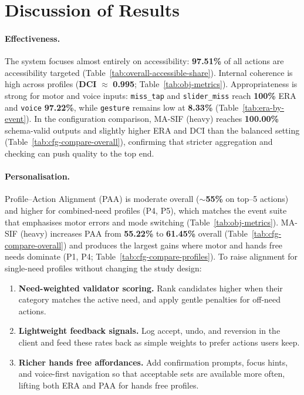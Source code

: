 \documentclass[openany]{book}
\begin{document}
\section{Discussion of Results}
\label{sec:discussion_eval}

\paragraph{Effectiveness.}
The system focuses almost entirely on accessibility: \textbf{97.51\%} of all actions are accessibility targeted (Table~\ref{tab:overall-accessible-share}). Internal coherence is high across profiles (\textbf{DCI} $\approx$ \textbf{0.995}; Table~\ref{tab:obj-metrics}). Appropriateness is strong for motor and voice inputs: \texttt{miss\_tap} and \texttt{slider\_miss} reach \textbf{100\%} ERA and \texttt{voice} \textbf{97.22\%}, while \texttt{gesture} remains low at \textbf{8.33\%} (Table~\ref{tab:era-by-event}). In the configuration comparison, MA-SIF (heavy) reaches \textbf{100.00\%} schema-valid outputs and slightly higher ERA and DCI than the balanced setting (Table~\ref{tab:cfg-compare-overall}), confirming that stricter aggregation and checking can push quality to the top end.

\paragraph{Personalisation.}
Profile–Action Alignment (PAA) is moderate overall (\(\sim\)\textbf{55\%} on top–5 actions) and higher for combined-need profiles (P4, P5), which matches the event suite that emphasises motor errors and mode switching (Table~\ref{tab:obj-metrics}). MA-SIF (heavy) increases PAA from \textbf{55.22\%} to \textbf{61.45\%} overall (Table~\ref{tab:cfg-compare-overall}) and produces the largest gains where motor and hands free needs dominate (P1, P4; Table~\ref{tab:cfg-compare-profiles}). To raise alignment for single-need profiles without changing the study design:
\begin{enumerate}
  \item \textbf{Need-weighted validator scoring.} Rank candidates higher when their category matches the active need, and apply gentle penalties for off-need actions.
  \item \textbf{Lightweight feedback signals.} Log accept, undo, and reversion in the client and feed these rates back as simple weights to prefer actions users keep.
  \item \textbf{Richer hands free affordances.} Add confirmation prompts, focus hints, and voice-first navigation so that acceptable sets are available more often, lifting both ERA and PAA for hands free profiles.
\end{enumerate}
\end{document}
